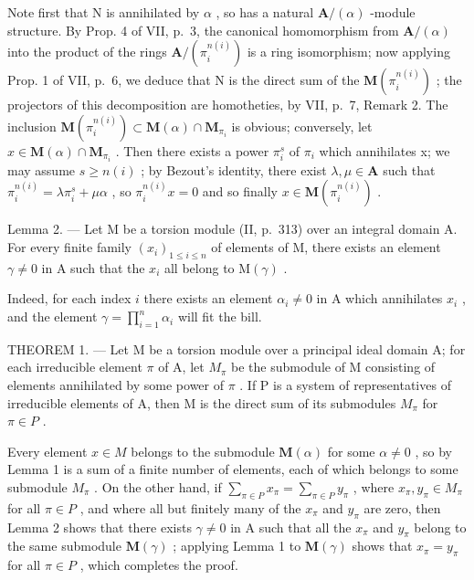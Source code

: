 Note first that N is annihilated by \(\alpha\) , so has a natural \(\mathbf{A}/(\alpha)\) -module structure. By Prop. 4 of VII, p.~3, the canonical homomorphism from \(\mathbf{A}/(\alpha)\) into the product of the rings \(\mathbf{A}/(\pi_{i}^{n(i)})\) is a ring isomorphism; now applying Prop. 1 of VII, p.~6, we deduce that N is the direct sum of the \(\mathbf{M}(\pi_{i}^{n(i)})\) ; the projectors of this decomposition are homotheties, by VII, p.~7, Remark 2. The inclusion \(\mathbf{M}(\pi_{i}^{n(i)})\subset\mathbf{M}(\alpha)\cap\mathbf{M}_{\pi_{i}}\) is obvious; conversely, let \(x\in\mathbf{M}(\alpha)\cap\mathbf{M}_{\pi_{i}}\) . Then there exists a power \(\pi_{i}^{s}\) of \(\pi_{i}\) which annihilates x; we may assume \(s\geqslant n(i)\) ; by Bezout's identity, there exist \(\lambda,\mu\in\mathbf{A}\) such that \(\pi_{i}^{n(i)}=\lambda\pi_{i}^{s}+\mu\alpha\) , so \(\pi_{i}^{n(i)}x=0\) and so finally \(x\in\mathbf{M}(\pi_{i}^{n(i)})\) .

Lemma 2. --- Let M be a torsion module (II, p.~313) over an integral domain A. For every finite family \((x_{i})_{1 \leq i \leq n}\) of elements of M, there exists an element \(\gamma \neq 0\) in A such that the \(x_{i}\) all belong to \(\mathrm{M}(\gamma)\) .

Indeed, for each index \(i\) there exists an element \(\alpha_{i} \neq 0\) in A which annihilates \(x_{i}\) , and the element \(\gamma = \prod_{i=1}^{n} \alpha_{i}\) will fit the bill.

THEOREM 1. --- Let M be a torsion module over a principal ideal domain A; for each irreducible element \(\pi\) of A, let \(M_{\pi}\) be the submodule of M consisting of elements annihilated by some power of \(\pi\) . If P is a system of representatives of irreducible elements of A, then M is the direct sum of its submodules \(M_{\pi}\) for \(\pi \in P\) .

Every element \(x \in M\) belongs to the submodule \(\mathbf{M}(\alpha)\) for some \(\alpha \neq 0\) , so by Lemma 1 is a sum of a finite number of elements, each of which belongs to some submodule \(M_{\pi}\) . On the other hand, if \(\sum_{\pi \in P} x_{\pi} = \sum_{\pi \in P} y_{\pi}\) , where \(x_{\pi}, y_{\pi} \in M_{\pi}\) for all \(\pi \in P\) , and where all but finitely many of the \(x_{\pi}\) and \(y_{\pi}\) are zero, then Lemma 2 shows that there exists \(\gamma \neq 0\) in A such that all the \(x_{\pi}\) and \(y_{\pi}\) belong to the same submodule \(\mathbf{M}(\gamma)\) ; applying Lemma 1 to \(\mathbf{M}(\gamma)\) shows that \(x_{\pi} = y_{\pi}\) for all \(\pi \in P\) , which completes the proof.

